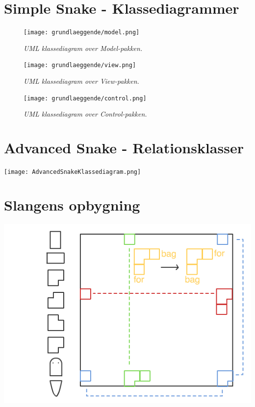 \chapter{Simple Snake - Klassediagrammer}


\begin{figure}[h]
	\centering
    \texttt{[image: grundlaeggende/model.png]}
	\hspace{0.1\textwidth}
	\caption{\textit{UML klassediagram over Model-pakken.}}
\end{figure}

\begin{figure}[h]
	\centering
    \texttt{[image: grundlaeggende/view.png]}
	\hspace{0.1\textwidth}
	\caption{\textit{UML klassediagram over View-pakken.}}
\end{figure}

\begin{figure}[h]
	\centering
    \texttt{[image: grundlaeggende/control.png]}
	\hspace{0.1\textwidth}
	\caption{\textit{UML klassediagram over Control-pakken.}}
\end{figure}


\chapter{Advanced Snake - Relationsklasser}
\newpage
\texttt{[image: AdvancedSnakeKlassediagram.png]}


\chapter{Slangens opbygning}
\includegraphics[width=1\textwidth]{SnakeGraphic.png}